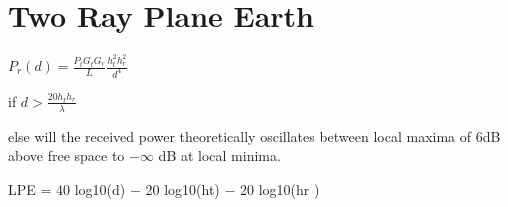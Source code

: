 \section{Two Ray Plane Earth}

$P_r(d) = \frac{P_t G_t G_r}{L} \frac{h^2_t h^2_r}{d^4}$

if $d > \frac{20 h_t h_r}{\lambda}$

else will the received power theoretically oscillates between
local maxima of 6dB above free space to $-\infty$ dB at local minima.





LPE = 40 log10(d) $-$ 20 log10(ht) $-$ 20 log10(hr )